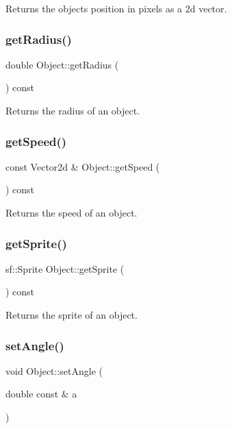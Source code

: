 Returns the objects position in pixels as a 2d vector. \hypertarget{classObject_a3d76eb87b30cfd6c9812a2d85a26b187}{}\label{classObject_a3d76eb87b30cfd6c9812a2d85a26b187} 
\subsubsection{\texorpdfstring{get\+Radius()}{getRadius()}}
{\footnotesize\ttfamily double Object\+::get\+Radius (\begin{DoxyParamCaption}{ }\end{DoxyParamCaption}) const}

Returns the radius of an object. \hypertarget{classObject_a0c3105820f784f07a6d20e019a8311a6}{}\label{classObject_a0c3105820f784f07a6d20e019a8311a6} 
\subsubsection{\texorpdfstring{get\+Speed()}{getSpeed()}}
{\footnotesize\ttfamily const Vector2d \& Object\+::get\+Speed (\begin{DoxyParamCaption}{ }\end{DoxyParamCaption}) const}

Returns the speed of an object. \hypertarget{classObject_add7c5a02624a3dbdf856517b18fce61f}{}\label{classObject_add7c5a02624a3dbdf856517b18fce61f} 
\subsubsection{\texorpdfstring{get\+Sprite()}{getSprite()}}
{\footnotesize\ttfamily sf\+::\+Sprite Object\+::get\+Sprite (\begin{DoxyParamCaption}{ }\end{DoxyParamCaption}) const}

Returns the sprite of an object. \hypertarget{classObject_a7e69ebba88f99341baf4d046be6493f1}{}\label{classObject_a7e69ebba88f99341baf4d046be6493f1} 
\subsubsection{\texorpdfstring{set\+Angle()}{setAngle()}}
{\footnotesize\ttfamily void Object\+::set\+Angle (\begin{DoxyParamCaption}\item[{double const \&}]{a }\end{DoxyParamCaption})}

